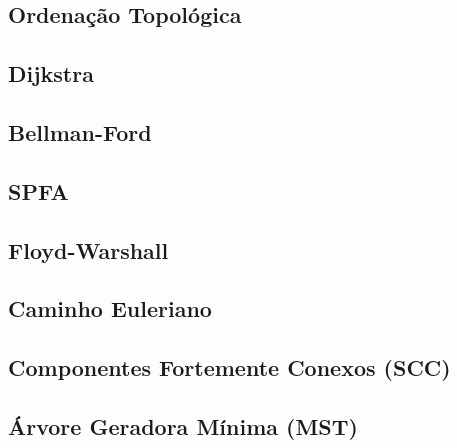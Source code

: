\subsection{Ordenação Topológica}


\subsection{Dijkstra}


\subsection{Bellman-Ford}


\subsection{SPFA}


\subsection{Floyd-Warshall}


\subsection{Caminho Euleriano}


% 

\subsection{Componentes Fortemente Conexos (SCC)}


\subsection{Árvore Geradora Mínima (MST)}


% 

